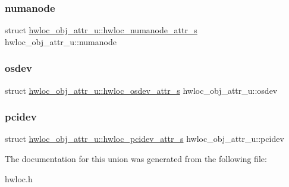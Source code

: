 \subsubsection{\texorpdfstring{numanode}{numanode}}
{\footnotesize\ttfamily struct \hyperlink{a00246}{hwloc\+\_\+obj\+\_\+attr\+\_\+u\+::hwloc\+\_\+numanode\+\_\+attr\+\_\+s}  hwloc\+\_\+obj\+\_\+attr\+\_\+u\+::numanode}

\mbox{\label{a00242_a22904c25fe44b323bab5c9bc52660fca}} 
\subsubsection{\texorpdfstring{osdev}{osdev}}
{\footnotesize\ttfamily struct \hyperlink{a00282}{hwloc\+\_\+obj\+\_\+attr\+\_\+u\+::hwloc\+\_\+osdev\+\_\+attr\+\_\+s}  hwloc\+\_\+obj\+\_\+attr\+\_\+u\+::osdev}

\mbox{\label{a00242_a4203d713ce0f5beaa6ee0e9bdac70828}} 
\subsubsection{\texorpdfstring{pcidev}{pcidev}}
{\footnotesize\ttfamily struct \hyperlink{a00262}{hwloc\+\_\+obj\+\_\+attr\+\_\+u\+::hwloc\+\_\+pcidev\+\_\+attr\+\_\+s}  hwloc\+\_\+obj\+\_\+attr\+\_\+u\+::pcidev}



The documentation for this union was generated from the following file\+:\begin{DoxyCompactItemize}
\item 
hwloc.\+h\end{DoxyCompactItemize}
